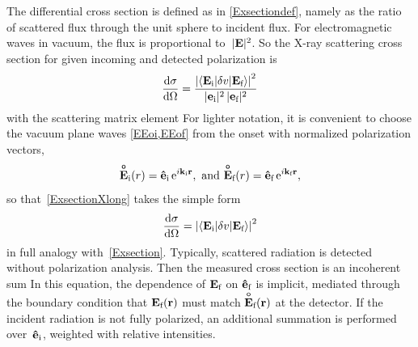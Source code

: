 The differential cross section
is defined as in \cref{Exsectiondef},
namely as the ratio of scattered flux through the unit sphere to incident flux.
%
%
%
For electromagnetic waves in vacuum, the flux is proportional to~$|\mathbf{E}|^2$.
So the X-ray scattering cross section for given incoming and detected polarization is
\begin{equation}%
  \xElas
  =  \frac{ {\left|\braket{\Ei|\delta v|\Ef}\right|}^2 }{|\v{e}_\si|^2\,|\v{e}_\sf|^2}
\end{equation}
with the scattering matrix element
%
For lighter notation,
it is convenient to choose the vacuum plane waves \cref{EEoi,EEof} from the onset
with normalized polarization vectors,
\begin{equation}%
  \Eo_\si(r) = \hei\, \e^{i\k_\si\r}, \text{~and~}
  \Eo_\sf(r) = \hef\, \e^{i\k_\sf\r},
\end{equation}
so that~\cref{ExsectionXlong}
takes the simple form
\begin{equation}%
  \xElas
  =  {\left|\braket{\Ei|\delta v|\Ef}\right|}^2
\end{equation}
in full analogy with~\cref{Exsection}.
Typically, scattered radiation is detected without polarization analysis.
%
%
%
%
Then the measured cross section is an incoherent sum
%
%
%
%
%
In this equation,
the dependence of $\mathbf{E}_{\text{f}}$ on $\mathbf{\hat e}_{\text{f}}$ is implicit,
mediated through the boundary condition
that $\mathbf{E}_{\text{f}}(\mathbf{r})$ must match $\mathsf{\overset{o}{\mathbf{E}}}_{\text{f}}(\mathbf{r})$ at the detector.
If the incident radiation is not fully polarized,
%
an additional summation is performed over~$\mathbf{\hat e}_{\text{i}}$,
weighted with relative intensities.

%

%
